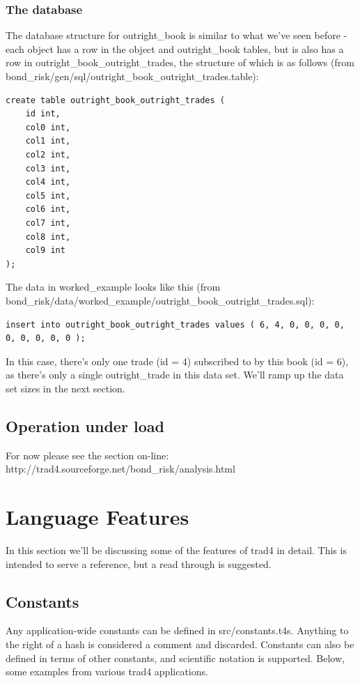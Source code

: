 \documentclass{report}
\begin{document}
\subsection{The database}

The database structure for outright_book is similar to what we've seen before - each object has a row in the object and outright_book tables, but is also has a row in outright_book_outright_trades, the structure of which is as follows (from bond_risk/gen/sql/outright_book_outright_trades.table):


\begin{verbatim}
create table outright_book_outright_trades (
    id int,
    col0 int,
    col1 int,
    col2 int,
    col3 int,
    col4 int,
    col5 int,
    col6 int,
    col7 int,
    col8 int,
    col9 int
);
\end{verbatim}

The data in worked_example looks like this (from bond_risk/data/worked_example/outright_book_outright_trades.sql):

\begin{verbatim}
insert into outright_book_outright_trades values ( 6, 4, 0, 0, 0, 0, 0, 0, 0, 0, 0 );
\end{verbatim}

In this case, there's only one trade (id = 4) subscribed to by this book (id = 6), as there's only a single outright_trade in this data set. We'll ramp up the data set sizes in the next section.

\section{Operation under load}

For now please see the section on-line: http://trad4.sourceforge.net/bond_risk/analysis.html

\chapter{Language Features}
\label{sec:Language Features}


In this section we'll be discussing some of the features of trad4 in detail. This is intended to serve a reference, but a read through is suggested.

\section{Constants}

Any application-wide constants can be defined in src/constants.t4s. Anything to the right of a hash is considered a comment and discarded. Constants can also be defined in terms of other constants, and scientific notation is supported. Below, some examples from various trad4 applications.
\end{document}
